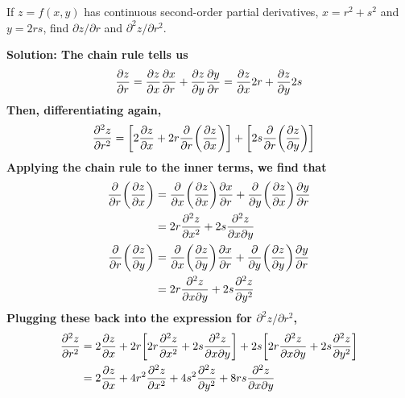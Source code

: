 \begin{example}
If \(z=f(x,y)\) has continuous second-order partial derivatives, \(x=r^2+s^2\) and \(y=2rs\), find \(\partial z/\partial r\) and \(\partial^2z/\partial r^2\).\par\bf{Solution: }The chain rule tells us
\[ \pdv{z}{r} = \pdv{z}{x}\pdv{x}{r} + \pdv{z}{y}\pdv{y}{r} = \pdv{z}{x}2r + \pdv{z}{y}2s \]
Then, differentiating again,
\begin{align*}
    \pdv[2]{z}{r} &= \bqty{2\pdv{z}{x}+2r\pdv{r}\pqty{\pdv{z}{x}}} + \bqty{2s\pdv{r}\pqty{\pdv{z}{y}}}
\end{align*} 
Applying the chain rule to the inner terms, we find that
\begin{align*}
    \pdv{r}\pqty{\pdv{z}{x}} &= \pdv{x}\pqty{\pdv{z}{x}}\pdv{x}{r} + \pdv{y}\pqty{\pdv{z}{x}}\pdv{y}{r} \\
    &= 2r\pdv[2]{z}{x} + 2s\frac{\partial^2z}{\partial x\partial y} \\
    \pdv{r}\pqty{\pdv{z}{y}} &= \pdv{x}\pqty{\pdv{z}{y}}\pdv{x}{r} + \pdv{y}\pqty{\pdv{z}{y}}\pdv{y}{r} \\
    &= 2r\frac{\partial^2z}{\partial x\partial y} + 2s\pdv[2]{z}{y}
\end{align*}
Plugging these back into the expression for \(\partial^2z/\partial r^2\),
\begin{align*}
    \pdv[2]{z}{r} &= 2\pdv{z}{x} + 2r\bqty{2r\pdv[2]{z}{x}+2s\frac{\partial^2z}{\partial x\partial y}}+2s\bqty{2r\frac{\partial^2z}{\partial x\partial y}+2s\pdv[2]{z}{y}} \\
    &= 2\pdv{z}{x} + 4r^2\pdv[2]{z}{x} + 4s^2\pdv[2]{z}{y} + 8rs\frac{\partial^2z}{\partial x\partial y}
\end{align*}
\end{example}

